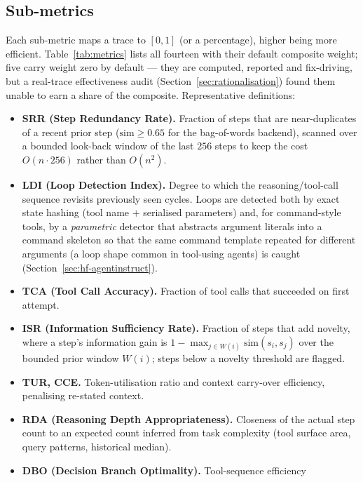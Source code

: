\documentclass[11pt]{article}
\begin{document}
\subsection{Sub-metrics}
\label{sec:metrics}
Each sub-metric maps a trace to $[0,1]$ (or a percentage), higher being more
efficient. Table~\ref{tab:metrics} lists all fourteen with their default
composite weight; five carry weight zero by default --- they are computed,
reported and fix-driving, but a real-trace effectiveness audit
(Section~\ref{sec:rationalisation}) found them unable to earn a share of the
composite. Representative definitions:

\begin{itemize}[leftmargin=*]
  \item \textbf{SRR (Step Redundancy Rate).} Fraction of steps that are
        near-duplicates of a recent prior step
        ($\mathrm{sim} \ge 0.65$ for the bag-of-words backend), scanned over a
        bounded look-back window of the last $256$ steps to keep the cost
        $O(n\cdot 256)$ rather than $O(n^2)$.
  \item \textbf{LDI (Loop Detection Index).} Degree to which the
        reasoning/tool-call sequence revisits previously seen cycles. Loops are
        detected both by exact state hashing (tool name $+$ serialised
        parameters) and, for command-style tools, by a \emph{parametric}
        detector that abstracts argument literals into a command skeleton so
        that the same command template repeated for different arguments (a loop
        shape common in tool-using agents) is caught (Section~\ref{sec:hf-agentinstruct}).
  \item \textbf{TCA (Tool Call Accuracy).} Fraction of tool calls that
        succeeded on first attempt.
  \item \textbf{ISR (Information Sufficiency Rate).} Fraction of steps that add
        novelty, where a step's information gain is
        $1 - \max_{j\in W(i)} \mathrm{sim}(s_i, s_j)$ over the bounded prior
        window $W(i)$; steps below a novelty threshold are flagged.
  \item \textbf{TUR, CCE.} Token-utilisation ratio and context carry-over
        efficiency, penalising re-stated context.
  \item \textbf{RDA (Reasoning Depth Appropriateness).} Closeness of the actual
        step count to an expected count inferred from task complexity (tool
        surface area, query patterns, historical median).
  \item \textbf{DBO (Decision Branch Optimality).} Tool-sequence efficiency

\end{itemize}
\end{document}
